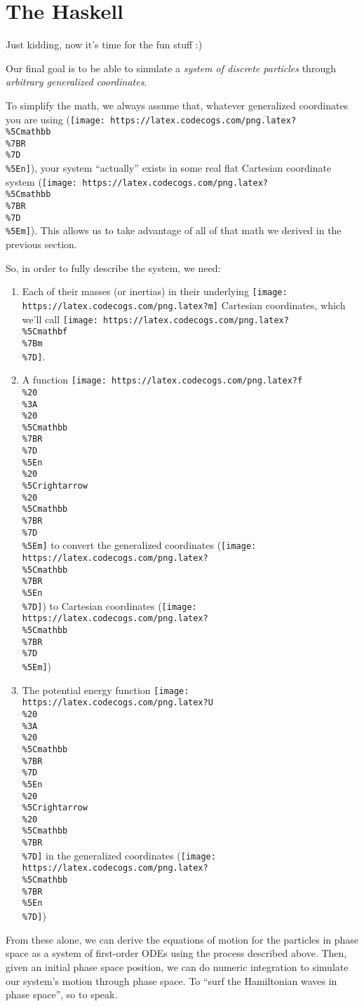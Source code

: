 \documentclass[]{article}
\begin{document}
\hypertarget{the-haskell}{%
\section{The Haskell}\label{the-haskell}}

Just kidding, now it's time for the fun stuff :)

Our final goal is to be able to simulate a \emph{system of discrete particles}
through \emph{arbitrary generalized coordinates}.

To simplify the math, we always assume that, whatever generalized coordinates
you are using
(\texttt{[image: https://latex.codecogs.com/png.latex?\\\%5Cmathbb\\\%7BR\\\%7D\\\%5En]}),
your system ``actually'' exists in some real flat Cartesian coordinate system
(\texttt{[image: https://latex.codecogs.com/png.latex?\\\%5Cmathbb\\\%7BR\\\%7D\\\%5Em]}).
This allows us to take advantage of all of that math we derived in the previous
section.

So, in order to fully describe the system, we need:

\begin{enumerate}
\def\labelenumi{\arabic{enumi}.}
\tightlist
\item
  Each of their masses (or inertias) in their underlying
  \texttt{[image: https://latex.codecogs.com/png.latex?m]} Cartesian
  coordinates, which we'll call
  \texttt{[image: https://latex.codecogs.com/png.latex?\\\%5Cmathbf\\\%7Bm\\\%7D]}.
\item
  A function
  \texttt{[image: https://latex.codecogs.com/png.latex?f\\\%20\\\%3A\\\%20\\\%5Cmathbb\\\%7BR\\\%7D\\\%5En\\\%20\\\%5Crightarrow\\\%20\\\%5Cmathbb\\\%7BR\\\%7D\\\%5Em]}
  to convert the generalized coordinates
  (\texttt{[image: https://latex.codecogs.com/png.latex?\\\%5Cmathbb\\\%7BR\\\%5En\\\%7D]})
  to Cartesian coordinates
  (\texttt{[image: https://latex.codecogs.com/png.latex?\\\%5Cmathbb\\\%7BR\\\%7D\\\%5Em]})
\item
  The potential energy function
  \texttt{[image: https://latex.codecogs.com/png.latex?U\\\%20\\\%3A\\\%20\\\%5Cmathbb\\\%7BR\\\%7D\\\%5En\\\%20\\\%5Crightarrow\\\%20\\\%5Cmathbb\\\%7BR\\\%7D]}
  in the generalized coordinates
  (\texttt{[image: https://latex.codecogs.com/png.latex?\\\%5Cmathbb\\\%7BR\\\%5En\\\%7D]})
\end{enumerate}

From these alone, we can derive the equations of motion for the particles in
phase space as a system of first-order ODEs using the process described above.
Then, given an initial phase space position, we can do numeric integration to
simulate our system's motion through phase space. To ``surf the Hamiltonian
waves in phase space'', so to speak.
\end{document}
